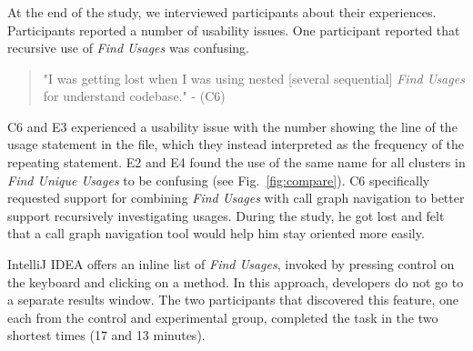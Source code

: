 \documentclass[conference]{IEEEtran}
\providecommand{\DIFadd}[1]{{\protect\color{blue}\uwave{#1}}} %
\providecommand{\DIFaddbegin}{} %
\providecommand{\DIFaddend}{} %
\newcommand{\DIFaddincludegraphics}[2][]{{\color{blue}\fbox{\DIFOincludegraphics[#1]{#2}}}} %
\DeclareRobustCommand{\DIFaddbegin}{\DIFOaddbegin \let\includegraphics\DIFaddincludegraphics} %
\DeclareRobustCommand{\DIFaddend}{\DIFOaddend \let\includegraphics\DIFOincludegraphics} %
\begin{document}
\DIFaddbegin \subsubsection{\DIFadd{Usability issues}}
\DIFaddend At the end of the study, we interviewed  participants about their experiences. Participants reported a number of usability issues. One participant reported that recursive use of \textit{Find Usages} was confusing. 
\begin{quote} "I was getting lost when I was using nested [several sequential] \textit{Find Usages} for understand codebase." - (C6)\end{quote}
\noindent C6 and E3 experienced a usability issue with the number showing the line of the usage statement in the file, which they instead interpreted as the frequency of the repeating statement.
E2 and E4 found the use of the same name for all clusters in \textit{Find Unique Usages} to be confusing (see Fig.~\ref{fig:compare}). 
C6 specifically requested support for combining \textit{Find Usages} with call graph navigation to better support recursively investigating usages. During the study, he got lost and felt that a call graph navigation tool would help him stay oriented more easily.\par


IntelliJ IDEA offers an inline list of \textit{Find Usages}, invoked by pressing control on the keyboard and clicking on a method. In this approach, developers do not go to a separate results window. The two participants that discovered this feature, one each from the control and experimental group, completed the task in the two shortest times (17 and 13 minutes).

\end{document}
